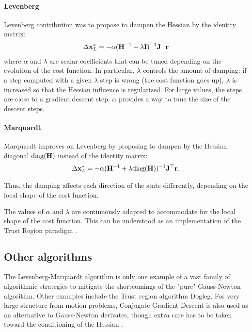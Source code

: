 \paragraph{Levenberg}
Levenberg \cite{levenberg1944method} contribution was to propose to dampen the Hessian by the identity matrix:
%
\begin{equation}
    \Delta {\bf x}_{L}^* = - \alpha ({\bf H}^{-1} + \lambda {\bf I})^{-1} {\bf J}^{\top} {\bf r}
\end{equation}
%
where $\alpha$ and $\lambda$ are scalar coefficients that can be tuned depending on the evolution of the cost function. 
In particular, $\lambda$ controls the amount of damping: if a step computed with a given $\lambda$ step is wrong (the cost function goes up),
$\lambda$ is increased so that the Hessian influence is regularized. For large values, the steps are close to a gradient descent step.
$\alpha$ provides a way to tune the size of the descent steps.



\paragraph{Marquardt}
Marquardt \cite{marquardt1963algorithm} improves on Levenberg by proposing to dampen by the Hessian diagonal $\text{diag}({\bf H})$
instead of the identity matrix:
%
\begin{equation}
    \Delta {\bf x}_{L}^* = - \alpha ({\bf H}^{-1} + \lambda \text{diag}({\bf H}))^{-1} {\bf J}^{\top} {\bf r}.
\end{equation}

Thus, the damping affects each direction of the state differently, depending on the local shape of the cost function.

The values of $\alpha$ and $\lambda$ are continuously adapted to accommodate for the local shape of the cost function. This can be understood as an implementation of the 
Trust Region paradigm \cite{boyd2004convex}. 

\subsection{Other algorithms}

The Levenberg-Marquardt algorithm is only one example of a vast family of algorithmic strategies 
to mitigate the shortcomings of the "pure" Gauss-Newton algorithm. Other examples include the Trust region algorithm Dogleg. For very large structure-from-motion problems, Conjugate Gradient Descent is also used as an alternative to Gauss-Newton derivates, though extra care has to 
be taken toward the conditioning of the Hessian \cite{jian2012generalized}.

